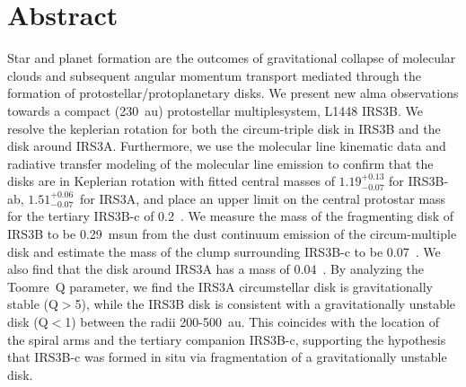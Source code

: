 {
\section*{Abstract}
Star and planet formation are the outcomes of gravitational collapse of molecular clouds and subsequent angular momentum transport mediated through the formation of protostellar/protoplanetary disks. We present new \acrfull{alma} observations towards a compact (230~\gls{au}) protostellar \gls{multiple}\space system, L1448 IRS3B. We resolve the \Gls{keplerian} rotation for both the circum-triple disk in IRS3B and the disk around IRS3A. Furthermore, we use the \gls{molecular} line kinematic data and radiative transfer modeling of the molecular line emission to confirm that the disks are in Keplerian rotation with fitted central masses of $1.19^{+0.13}_{-0.07}$ for IRS3B-ab, $1.51^{+0.06}_{-0.07}$~\msun\space for IRS3A, and place an upper limit on the central \gls{protostar} mass for the tertiary IRS3B-c of 0.2~\msun. We measure the mass of the fragmenting disk of IRS3B to be 0.29~\acrshort{msun} from the dust \gls{continuum} emission of the circum-multiple disk and estimate the mass of the clump surrounding IRS3B-c to be 0.07~\msun. We also find that the disk around IRS3A has a mass of 0.04~\msun. By analyzing the Toomre~Q parameter, we find the IRS3A circumstellar disk is gravitationally stable (Q$>$5), while the IRS3B disk is consistent with a gravitationally unstable disk (Q$<$1) between the radii 200-500~au. This coincides with the location of the spiral arms and the tertiary companion IRS3B-c, supporting the hypothesis that IRS3B-c was formed in situ via fragmentation of a gravitationally unstable disk.
}